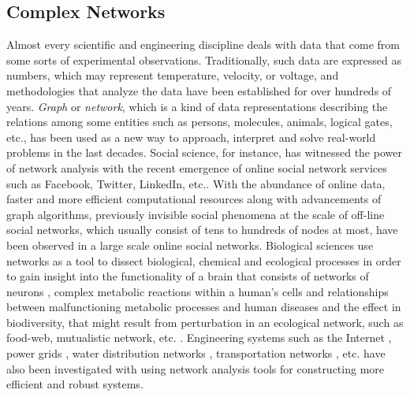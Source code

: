 \documentclass[..]{revtex4}
\begin{document}
	\subsection{Complex Networks}
	Almost every scientific and engineering discipline deals with data that come from some sorts of experimental observations. Traditionally, such data are expressed as numbers, which may represent temperature, velocity, or voltage, and methodologies that analyze the data have been established for over hundreds of years. \textit{Graph} or \textit{network}, which is a kind of data representations describing the relations among some entities such as persons, molecules, animals, logical gates, etc., has been used as a new way to approach, interpret and solve real-world problems in the last decades. Social science, for instance, has witnessed the power of network analysis with the recent emergence of online social network services such as Facebook, Twitter, LinkedIn, etc.\cite{Kleinberg:1}. With the abundance of online data, faster and more efficient computational resources along with advancements of graph algorithms, previously invisible social phenomena at the scale of off-line social networks, which usually consist of tens to hundreds of nodes at most, have been observed in a large scale online social networks.  Biological sciences use networks as a tool to dissect biological, chemical and ecological processes in order to gain insight into the functionality of a brain that consists of networks of neurons \cite{BrainNetwork}, complex metabolic reactions within a human's cells and relationships between malfunctioning metabolic processes and human diseases \cite{MetabolicNetworkAndDiseases} and the effect in biodiversity, that might result from perturbation in an ecological network, such as food-web, mutualistic network, etc. \cite{EcologicalNetwork}. Engineering systems such as the Internet \cite{Internet}, power grids \cite{PowerGrid}, water distribution networks \cite{WaterDistribution}, transportation networks \cite{Train}, etc. have also been investigated with using network analysis tools for constructing more efficient and robust systems. 
	
\end{document}
